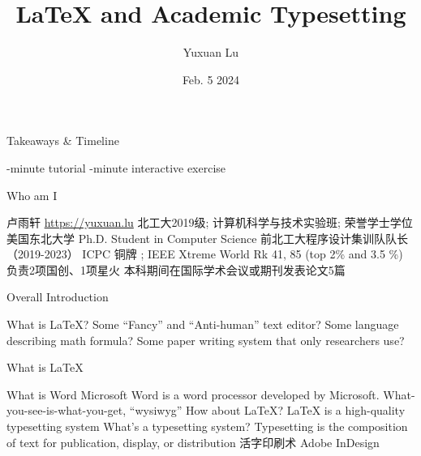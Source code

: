 \documentclass[scheme=plain,aspectratio=169]{ctexbeamer}
\title{LaTeX and Academic Typesetting}
\author{Yuxuan Lu}
\institute{北京工业大学程序设计集训队}
\institute{Northeastern Human-Centered AI Lab}
\date{Feb. 5 2024}
\let\OriginLaTeX\LaTeX
\renewcommand\LaTeX{\textrm{\OriginLaTeX\xspace}}
\begin{document}
\maketitle

\begin{frame}{Takeaways \& Timeline}
    \begin{outline}
        -minute tutorial
        -minute interactive exercise
    \end{outline}
\end{frame}

\ifbjut
\begin{frame}{Who am I}
    \begin{outline}
        \Large
        \1 卢雨轩
        \normalsize
        \1 \url{https://yuxuan.lu}
        \1 北工大2019级; 计算机科学与技术实验班; 荣誉学士学位
        \1 美国东北大学 Ph.D. Student in Computer Science
        \1 前北工大程序设计集训队队长（2019-2023）
        \1 ICPC 铜牌 ; IEEE Xtreme World Rk 41, 85 (top 2\% and 3.5 \%)
        \1 负责2项国创、1项星火
        \1 本科期间在国际学术会议或期刊发表论文5篇
    \end{outline}
\end{frame}
\fi

\begin{frame}{Overall Introduction}
    \begin{outline}
        \1 What is \LaTeX?
            \2 Some ``Fancy'' and ``Anti-human'' text editor?
            \2 Some language describing math formula?
            \2 Some paper writing system that only researchers use?
    \end{outline}
\end{frame}
\begin{frame}{What is \LaTeX}
    \begin{outline}
        \1 What is Word
            \2 Microsoft Word is a word processor developed by Microsoft.
            \2 What-you-see-is-what-you-get, ``wysiwyg''
            \1 How about \LaTeX?
            \2 LaTeX is a high-quality typesetting system
        \pause
        \1 What's a typesetting system?
            \tiny
            \2 Typesetting is the composition of text for publication, display, or distribution
            \normalsize
            \ifbjut
            \2 活字印刷术
            \fi
            \2 Adobe InDesign
    \end{outline}
\end{frame}
\end{document}
